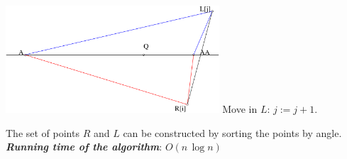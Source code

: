 \begin{center}
\includegraphics[height=4cm]{img/abra44.pdf}
Move in $L$: $j:=j+1$.\\
\end{center}

The set of points $R$ and $L$ can be constructed by sorting the points by angle.
\\
\emph{\textbf{Running time of the algorithm}}: $O(n \, \log n)$

